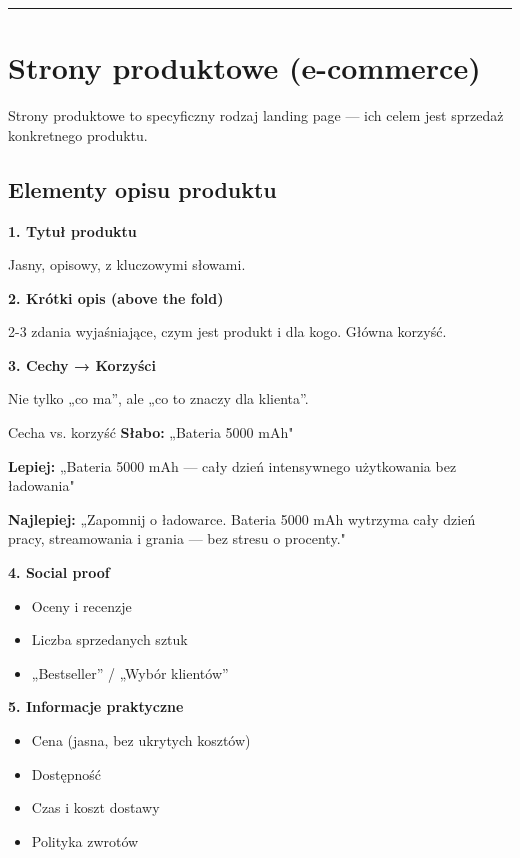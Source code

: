 \documentclass[
  12pt,
  a4paper,
  twoside,
  openright,
  12pt,
  DIV=12,
  BCOR=12mm]{scrbook}
\providecommand{\tightlist}{%
  \setlength{\itemsep}{0pt}\setlength{\parskip}{0pt}}\usepackage{longtable,booktabs,array}
\newcommand{\decoline}{%
  \begin{center}
    \textcolor{bordergray}{\rule{0.3\textwidth}{0.5pt}}
  \end{center}
}
\begin{document}
\decoline

\section{Strony produktowe
(e-commerce)}\label{strony-produktowe-e-commerce-1}

Strony produktowe to specyficzny rodzaj landing page --- ich celem jest
sprzedaż konkretnego produktu.

\subsection{Elementy opisu produktu}\label{elementy-opisu-produktu}

\textbf{1. Tytuł produktu}

Jasny, opisowy, z kluczowymi słowami.

\textbf{2. Krótki opis (above the fold)}

2-3 zdania wyjaśniające, czym jest produkt i dla kogo. Główna korzyść.

\textbf{3. Cechy → Korzyści}

Nie tylko „co ma'', ale „co to znaczy dla klienta''.

\begin{przyklad}{Cecha vs. korzyść}
\textbf{Słabo:} „Bateria 5000 mAh"

\textbf{Lepiej:} „Bateria 5000 mAh --- cały dzień intensywnego użytkowania bez ładowania"

\textbf{Najlepiej:} „Zapomnij o ładowarce. Bateria 5000 mAh wytrzyma cały dzień pracy, streamowania i grania --- bez stresu o procenty."
\end{przyklad}

\textbf{4. Social proof}

\begin{itemize}
\tightlist
\item
  Oceny i recenzje
\item
  Liczba sprzedanych sztuk
\item
  „Bestseller'' / „Wybór klientów''
\end{itemize}

\textbf{5. Informacje praktyczne}

\begin{itemize}
\tightlist
\item
  Cena (jasna, bez ukrytych kosztów)
\item
  Dostępność
\item
  Czas i koszt dostawy
\item
  Polityka zwrotów
\end{itemize}
\end{document}
